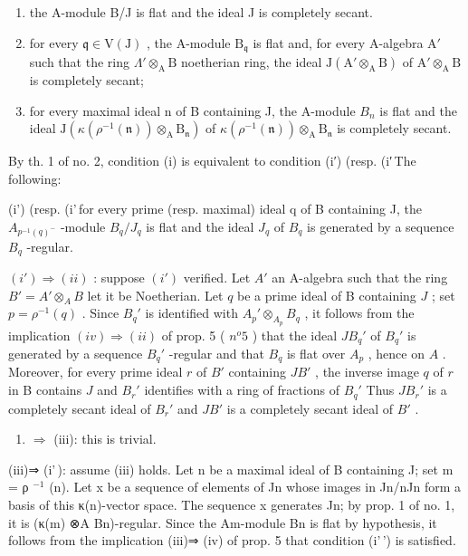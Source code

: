 \begin{enumerate}
\def\labelenumi{(\roman{enumi})}
\item
  the A-module B/J is flat and the ideal J is completely secant.
\item
  for every \(\mathfrak{q} \in \mathrm{V}(\mathrm{J})\) , the A-module \(\mathrm{B}_{\mathfrak{q}}\) is flat and, for every A-algebra \(\mathrm{A}'\) such that the ring \(\Lambda' \otimes_{\mathrm{A}} \mathrm{B}\) noetherian ring, the ideal \(\mathrm{J}(\mathrm{A}' \otimes_{\mathrm{A}} \mathrm{B})\) of \(\mathrm{A}' \otimes_{\mathrm{A}} \mathrm{B}\) is completely secant;
\item
  for every maximal ideal n of B containing J, the A-module \(B_{n}\) is flat and the ideal \(\mathrm{J}(\kappa(\rho^{-1}(\mathfrak{n}))\otimes_{\mathrm{A}}\mathrm{B}_{\mathfrak{n}})\) of \(\kappa(\rho^{-1}(\mathfrak{n}))\otimes_{\mathrm{A}}\mathrm{B}_{\mathfrak{n}}\) is completely secant.
\end{enumerate}

By th. 1 of no. 2, condition (i) is equivalent to condition (i′) (resp. (i′\,The following:

(i') (resp. (i'\,for every prime (resp. maximal) ideal q of B containing J, the \(A_{p^{-1}(q)^{-}}\) -module \(B_{q}/J_{q}\) is flat and the ideal \(J_{q}\) of \(B_{q}\) is generated by a sequence \(B_{q}\) -regular.

\((i') \Rightarrow (ii)\) : suppose \((i')\) verified. Let \(A'\) an A-algebra such that the ring \(B' = A' \otimes_A B\) let it be Noetherian. Let \(q\) be a prime ideal of B containing \(J\) ; set \(p = \rho^{-1}(q)\) . Since \(B_q'\) is identified with \(A_p' \otimes_{A_p} B_q\) , it follows from the implication \((iv) \Rightarrow (ii)\) of prop. 5 ( \(n^o 5\) ) that the ideal \(JB_q'\) of \(B_q'\) is generated by a sequence \(B_q'\) -regular and that \(B_q\) is flat over \(A_p\) , hence on \(A\) . Moreover, for every prime ideal \(r\) of \(B'\) containing \(JB'\) , the inverse image \(q\) of \(r\) in B contains \(J\) and \(B_r'\) identifies with a ring of fractions of \(B_q'\) Thus \(JB_r'\) is a completely secant ideal of \(B_r'\) and \(JB'\) is a completely secant ideal of \(B'\) .

\begin{enumerate}
\def\labelenumi{(\roman{enumi})}
\setcounter{enumi}{1}
\tightlist
\item
  \(\Rightarrow\) (iii): this is trivial.
\end{enumerate}

(iii)⇒ (i'\,): assume (iii) holds. Let n be a maximal ideal of B containing J; set m = ρ \(^{-1}\) (n). Let x be a sequence of elements of Jn whose images in Jn/nJn form a basis of this κ(n)-vector space. The sequence x generates Jn; by prop. 1 of no. 1, it is (κ(m) ⊗A Bn)-regular. Since the Am-module Bn is flat by hypothesis, it follows from the implication (iii)⇒ (iv) of prop. 5 that condition (i'\,') is satisfied.

